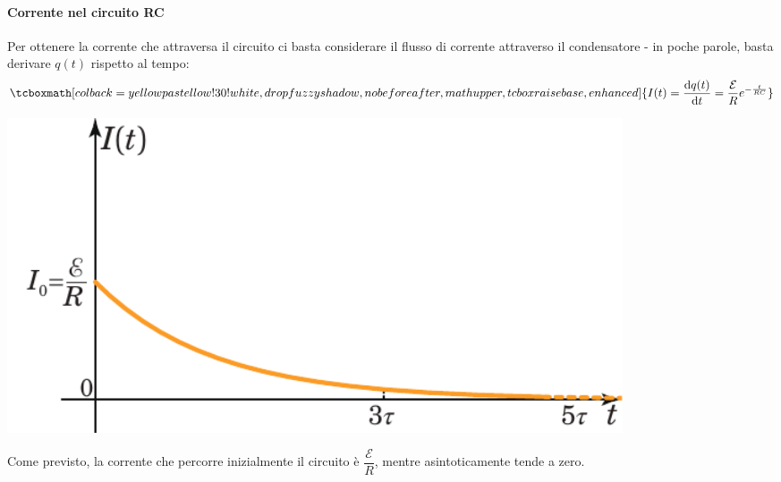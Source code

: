 \paragraph{Corrente nel circuito RC}
Per ottenere la corrente che attraversa il circuito ci basta considerare il flusso di corrente attraverso il condensatore - in poche parole, basta derivare $q(t)$ rispetto al tempo:
\begin{equation}
	\tcboxmath[colback=yellowpastellow!30!white,drop fuzzy shadow, nobeforeafter, math upper, tcbox raise base, enhanced]{I(t)=\dv{q(t)}{t}=\frac{\mathcal{E}}{R}e^{-\frac{t}{RC}}}
\end{equation}
\begin{center}
	\includegraphics[width=0.8\textwidth]{images/chp5/chp5caricacondgraf2.pdf}
\end{center}
Come previsto, la corrente che percorre inizialmente il circuito è $\dfrac{\mathcal{E}}{R}$, mentre asintoticamente tende a zero.
